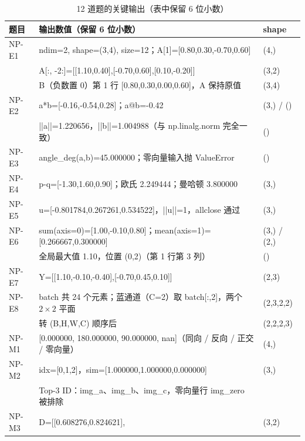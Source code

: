 \documentclass[a4paper,12pt]{article}
\newcommand{\code}[1]{{\ttfamily\footnotesize #1}}
\begin{document}
\begin{table}[H]
\centering
\small
\setlength{\tabcolsep}{4pt}
\caption{12 道题的关键输出（表中保留 6 位小数）}
\label{tab:results}
\begin{tabular}{@{}l p{10.2cm} p{2.0cm}@{}}
\toprule
\textbf{题目} & \textbf{输出数值（保留 6 位小数）} & \textbf{shape} \\
\midrule
NP-E1 & \code{ndim=2, shape=(3,4), size=12}；\code{A[1]=[0.80,0.30,-0.70,0.60]} & \code{(4,)} \\
      & \code{A[:, -2:]=[[1.10,0.40],[-0.70,0.60],[0.10,-0.20]]} & \code{(3,2)} \\
      & \code{B}（负数置 0）第 1 行 \code{[0.80,0.30,0.00,0.60]}，\code{A} 保持原值 & \code{(3,4)} \\
NP-E2 & \code{a*b=[-0.16,-0.54,0.28]}；\code{a@b=-0.42} & \code{(3,)} / \code{()} \\
      & \code{||a||=1.220656}，\code{||b||=1.004988}（与 \code{np.linalg.norm} 完全一致） & \code{()} \\
NP-E3 & \code{angle\_deg(a,b)=45.000000}；零向量输入抛 \code{ValueError} & \code{()} \\
NP-E4 & \code{p-q=[-1.30,1.60,0.90]}；欧氏 \code{2.249444}；曼哈顿 \code{3.800000} & \code{(3,)} \\
NP-E5 & \code{u=[-0.801784,0.267261,0.534522]}，\code{||u||=1}，\code{allclose} 通过 & \code{(3,)} \\
NP-E6 & \code{sum(axis=0)=[1.00,-0.10,0.80]}；\code{mean(axis=1)=[0.266667,0.300000]} & \code{(3,)} / \code{(2,)} \\
      & 全局最大值 \code{1.10}，位置 \code{(0,2)}（第 1 行第 3 列） & \code{()} \\
NP-E7 & \code{Y=[[1.10,-0.10,-0.40],[-0.70,0.45,0.10]]} & \code{(2,3)} \\
NP-E8 & \code{batch} 共 24 个元素；蓝通道（C=2）取 \code{batch[:,2]}，两个 $2\times2$ 平面 & \code{(2,3,2,2)} \\
      & 转 \code{(B,H,W,C)} 顺序后 & \code{(2,2,2,3)} \\
NP-M1 & \code{[0.000000, 180.000000, 90.000000, nan]}（同向 / 反向 / 正交 / 零向量） & \code{(4,)} \\
NP-M2 & \code{idx=[0,1,2]}，\code{sim=[1.000000,1.000000,0.000000]} & \code{(3,)} \\
      & Top-3 ID：\code{img\_a}、\code{img\_b}、\code{img\_c}，零向量行 \code{img\_zero} 被排除 & \\
NP-M3 & \code{D=[[0.608276,0.824621],} & \code{(3,2)} \\

\end{tabular}
\end{table}
\end{document}
